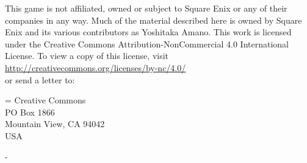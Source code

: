 \begin{multicols}{2}
This game is not affiliated, owned or subject to Square Enix or any of their companies in any way. Much of the material described here is owned by Square Enix and its various contributors as Yoshitaka Amano. This work is licensed under the Creative Commons Attribution-NonCommercial 4.0 International License. To view a copy of this license, visit\\
\url{http://creativecommons.org/licenses/by-nc/4.0/}\\
or send a letter to:

\hangindent=\parindent%
Creative Commons\\
PO Box 1866\\
Mountain View, CA 94042\\
USA


- \ferrum%

\end{multicols}
\newpage

